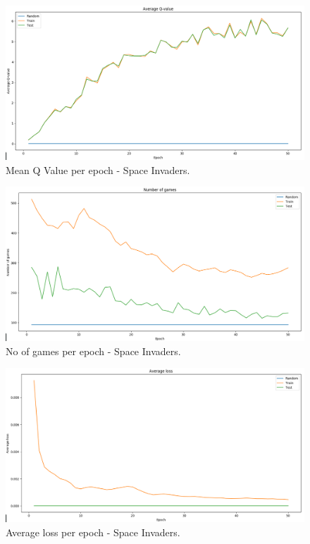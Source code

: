 \documentclass[a4paper,11pt]{report}
\begin{document}
			\begin{figure}[H]
				\begin{centering}
					\includegraphics[width=15cm]{images/space_2_meanq.png}
					\caption{Mean Q Value per epoch - Space Invaders.}
				\end{centering}
			\end{figure}			
			
			\begin{figure}[H]
				\begin{centering}
					\includegraphics[width=15cm]{images/space_3_nrgames.png}
					\caption{No of games per epoch - Space Invaders.}
				\end{centering}
			\end{figure}			
			
			\begin{figure}[H]
				\begin{centering}
					\includegraphics[width=15cm]{images/space_4_averageloss.png}
					\caption{Average loss per epoch - Space Invaders.}
				\end{centering}
			\end{figure}			
			
\end{document}
